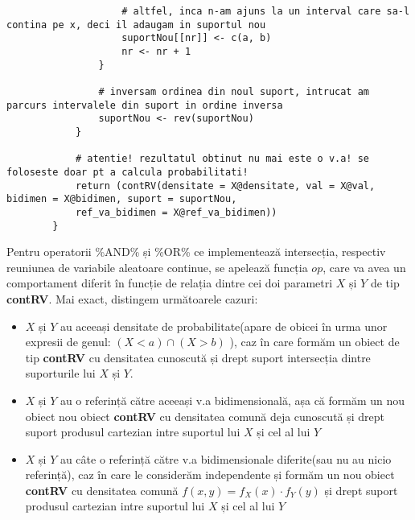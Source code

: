 \documentclass[12pt]{article}
\begin{document}
\begin{lstlisting}
					# altfel, inca n-am ajuns la un interval care sa-l contina pe x, deci il adaugam in suportul nou
					suportNou[[nr]] <- c(a, b)
					nr <- nr + 1
				}
				
				# inversam ordinea din noul suport, intrucat am parcurs intervalele din suport in ordine inversa
				suportNou <- rev(suportNou)
			}
			
			# atentie! rezultatul obtinut nu mai este o v.a! se foloseste doar pt a calcula probabilitati!
			return (contRV(densitate = X@densitate, val = X@val, bidimen = X@bidimen, suport = suportNou,
			ref_va_bidimen = X@ref_va_bidimen))
		}
	\end{lstlisting}\pagebreak
	
	Pentru operatorii \%AND\% și \%OR\% ce implementează intersecția, respectiv reuniunea de variabile aleatoare continue, se apelează funcția $op$, care va avea un comportament diferit în funcție de relația dintre cei doi parametri $X$ și $Y$ de tip \textbf{contRV}. Mai exact, distingem următoarele cazuri:
	\begin{itemize}
		\item $X$ și $Y$ au aceeași densitate de probabilitate(apare de obicei în urma unor expresii de genul: $(X < a) \cap (X > b)$ ), caz în care formăm un obiect de tip \textbf{contRV} cu densitatea cunoscută și drept suport intersecția dintre suporturile lui $X$ și $Y$.
		\item $X$ și $Y$ au o referință către aceeași v.a bidimensională, așa că formăm un nou obiect nou obiect \textbf{contRV} cu densitatea comună deja cunoscută și drept suport produsul cartezian intre suportul lui $X$ și cel al lui $Y$
		\item $X$ și $Y$ au câte o referință către v.a bidimensionale diferite(sau nu au nicio referință), caz în care le considerăm independente și formăm un nou obiect \textbf{contRV} cu densitatea comună $f(x, y) = f_X(x) \cdot f_Y(y)$ și drept suport produsul cartezian intre suportul lui $X$ și cel al lui $Y$		
	\end{itemize}
\end{document}
